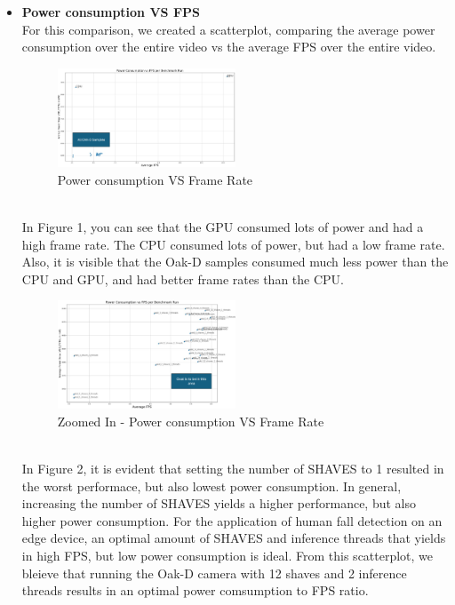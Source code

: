 \documentclass[sigconf,authorversion,nonacm]{acmart}
\begin{document}

\begin{itemize}
    \item \textbf{Power consumption VS FPS} \\ For this comparison, we created a scatterplot, comparing the average power consumption over the entire video vs the average FPS over the entire video. 
    \begin{figure}[h] %
        \centering
        \includegraphics[width=0.5\textwidth]{figures/scatter1.png}
        \caption{Power consumption VS Frame Rate}
        \label{fig:your_label}
    \end{figure}
    \\ In Figure 1, you can see that the GPU consumed lots of power and had a high frame rate. The CPU consumed lots of power, but had a low frame rate. Also, it is visible that the Oak-D samples consumed much less power than the CPU and GPU, and had better frame rates than the CPU.
    \begin{figure}[h] %
        \centering
        \includegraphics[width=0.5\textwidth]{figures/scatter2.png}
        \caption{Zoomed In - Power consumption VS Frame Rate}
        \label{fig:your_label}
    \end{figure}
    \\ In Figure 2, it is evident that setting the number of SHAVES to 1 resulted in the worst performace, but also lowest power consumption. In general, increasing the number of SHAVES yields a higher performance, but also higher power consumption. For the application of human fall detection on an edge device, an optimal amount of SHAVES and inference threads that yields in high FPS, but low power consumption is ideal. From this scatterplot, we bleieve that running the Oak-D camera with 12 shaves and 2 inference threads results in an optimal power comsumption to FPS ratio.
    

\end{itemize}
\end{document}
